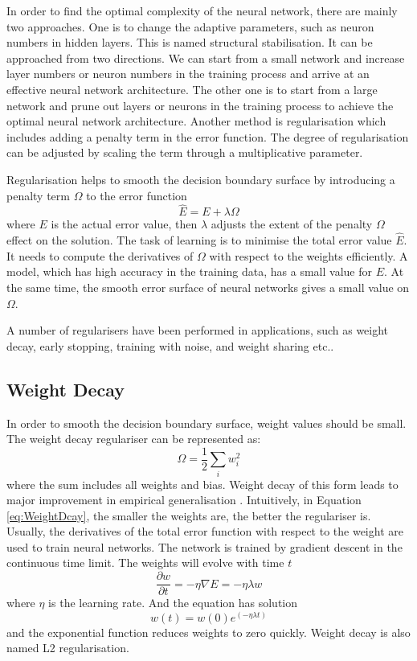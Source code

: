 In order to find the optimal complexity of the neural network, there are mainly two approaches. One is to change the adaptive parameters, such as neuron numbers in hidden layers. This is named structural stabilisation. It can be approached from two directions. We can start from a small network and increase layer numbers or neuron numbers in the training process and arrive at an effective neural network architecture. The other one is to start from a large network and prune out layers or neurons in the training process to achieve the optimal neural network architecture. Another method is regularisation which includes adding a penalty term in the error function. The degree of regularisation can be adjusted by scaling the term through a multiplicative parameter.

Regularisation helps to smooth the decision boundary surface by introducing a penalty term $\Omega$ to the error function
\begin{equation}\label{eq:Regularization}
\hat{E} = E + \lambda\Omega
\end{equation}
where $E$ is the actual error value, then $\lambda$ adjusts the extent of the penalty $\Omega$ effect on the solution. The task of learning is to minimise the total error value $\hat{E}$. It needs to compute the derivatives of $\Omega$ with respect to the weights efficiently. A model, which has high accuracy in the training data, has a small value for $E$. At the same time, the smooth error surface of neural networks gives a small value on $\Omega$.

A number of regularisers have been performed in applications, such as weight decay, early stopping, training with noise, and weight sharing etc..

\subsection{Weight Decay}

In order to smooth the decision boundary surface, weight values should be small. The weight decay regulariser can be represented as:
\begin{equation}\label{eq:WeightDcay}
\Omega = \frac{1}{2} \sum_i w_{i}^2
\end{equation}
where the sum includes all weights and bias. Weight decay of this form leads to major improvement in empirical generalisation \citep{hinton1987learning}. Intuitively, in Equation \ref{eq:WeightDcay}, the smaller the weights are, the better the regulariser is. Usually, the derivatives of the total error function with respect to the weight are used to train neural networks. The network is trained by gradient descent in the continuous time limit. The weights will evolve with time $t$
\begin{equation}\label{eq:WeightDecayTime}
\frac{\partial w}{\partial t} = -\eta\nabla E = -\eta\lambda w
\end{equation}
where $\eta$ is the learning rate. And the equation has solution
\begin{equation}\label{eq:WeightDecaySolution}
w(t) = w(0)e^{(-\eta\lambda t)}
\end{equation}
and the exponential function reduces weights to zero quickly. Weight decay is also named L2 regularisation.

